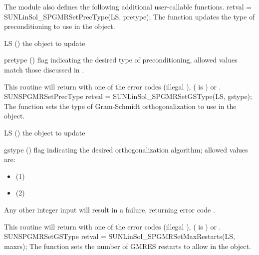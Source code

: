 The {\sunlinsolspgmr} module also defines the following additional
user-callable functions.
%
%
{
  retval = SUNLinSol\_SPGMRSetPrecType(LS, pretype);
}
{
  The function  updates the type of
  preconditioning to use in the {\sunlinsolspgmr} object.
}
{
  \begin{args}[pretype]
  \item[LS] ()
    the {\sunlinsolspgmr} object to update
  \item[pretype] ()
    flag indicating the desired type of preconditioning, allowed
    values match those discussed in .
  \end{args}
}
{
  This routine will return with one of the error codes
   (illegal ), 
  ( is ) or .
}
{}
{SUNSPGMRSetPrecType}
%
%
{
  retval = SUNLinSol\_SPGMRSetGSType(LS, gstype);
}
{
  The function  sets the type of
  Gram-Schmidt orthogonalization to use in the {\sunlinsolspgmr}
  object.
}
{
  \begin{args}[gstype]
  \item[LS] ()
    the {\sunlinsolspgmr} object to update
  \item[gstype] ()
    flag indicating the desired orthogonalization algorithm; allowed
    values are:
    \begin{itemize}
    \item {} (1)
    \item {} (2)
    \end{itemize}
    Any other integer input will result in a
    failure, returning error code \newline {}.
  \end{args}
}
{
  This routine will return with one of the error codes
   (illegal ), 
  ( is ) or .
}
{}
{SUNSPGMRSetGSType}
%
%
{
  retval = SUNLinSol\_SPGMRSetMaxRestarts(LS, maxrs);
}
{
  The function  sets the number of
  GMRES restarts to allow in the {\sunlinsolspgmr} object.
}
